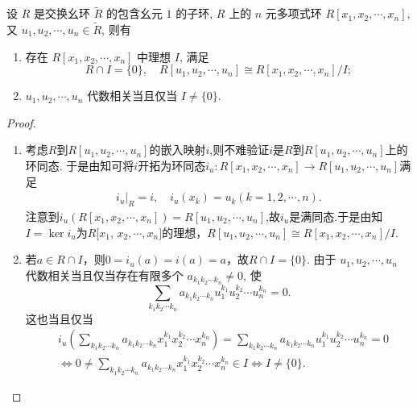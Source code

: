 \documentclass[../../main.tex]{subfiles}%
\begin{document}
\begin{corollary}
设 \( R \) 是交换幺环 \( \widetilde{R} \) 的包含幺元 \( 1 \) 的子环, \( R \) 上的 \( n \) 元多项式环 \( R[x_1, x_2, \cdots, x_n] \), 又 \( u_1, u_2, \cdots, u_n \in \widetilde{R} \), 则有
\begin{enumerate}[(1)]
\item 存在 \( R[x_1, x_2, \cdots, x_n] \) 中理想 \( I \), 满足
\[
R \cap I = \{0\}, \quad R[u_1, u_2, \cdots, u_n] \cong R[x_1, x_2, \cdots, x_n]/I;
\]
\item \( u_1, u_2, \cdots, u_n \) 代数相关当且仅当 \( I \neq \{0\} \).
\end{enumerate}
\end{corollary}
\begin{proof}
\begin{enumerate}[(1)]
\item 考虑$R$到$R[u_1,u_2,\cdots ,u_n]$的嵌入映射$i$,则不难验证$i$是$R$到$R[u_1,u_2,\cdots ,u_n]$上的环同态. 于是由知可将$i$开拓为环同态$i_u:R[x_1, x_2, \cdots, x_n]\to R[u_1,u_2,\cdots ,u_n]$满足
\begin{align*}
i_u|_R=i,\quad i_u(x_k)=u_k(k=1,2,\cdots,n).
\end{align*}
注意到$i_u(R[x_1, x_2, \cdots, x_n])=R[u_1,u_2,\cdots ,u_n]$,故$i_u$是满同态.于是由知$I=\ker i_u$为$R$[$x_1$, $x_2, \cdots, x_n]$的理想，$R[u_1,u_2,\cdots ,u_n]\cong R[x_1, x_2, \cdots, x_n]/I$. 

\item 若$a\in R\cap I$，则$0=i_u(a)=i(a)=a$，故$R\cap I=\{0\}$. 
由于 \( u_1, u_2, \cdots, u_n \) 代数相关当且仅当存在有限多个 \( a_{k_1 k_2 \cdots k_n} \neq 0 \), 使
\[
\sum_{k_1 k_2 \cdots k_n} a_{k_1 k_2 \cdots k_n} u_1^{k_1} u_2^{k_2} \cdots u_n^{k_n} = 0.
\]
这也当且仅当
\begin{align*}
&i_u\left( \sum_{k_1k_2\cdots k_n}{a_{k_1k_2\cdots k_n}x_{1}^{k_1}x_{2}^{k_2}}\cdots x_{n}^{k_n} \right) =\sum_{k_1k_2\cdots k_n}{a_{k_1k_2\cdots k_n}u_{1}^{k_1}u_{2}^{k_2}}\cdots u_{n}^{k_n}=0
\\
&\Longleftrightarrow 0\ne \sum_{k_1k_2\cdots k_n}{a_{k_1k_2\cdots k_n}x_{1}^{k_1}x_{2}^{k_2}}\cdots x_{n}^{k_n}\in I\Longleftrightarrow I\ne \{0\}.
\end{align*}
\end{enumerate}

\end{proof}
\end{document}
